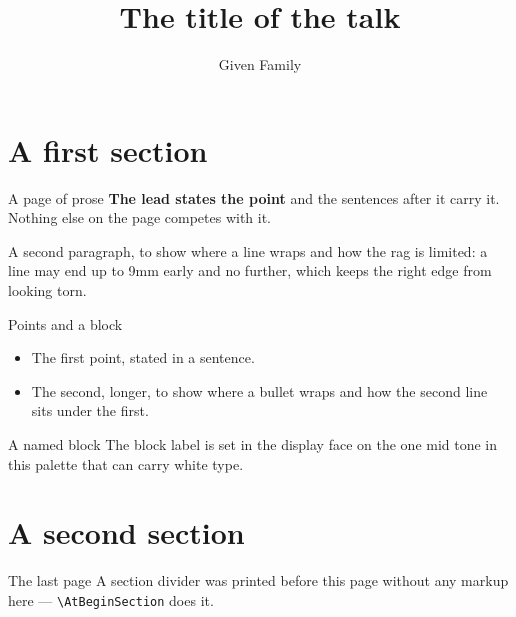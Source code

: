 \documentclass[aspectratio=169]{beamer}
\title[Short title]{The title of the talk}
\author[Given Family]{Given Family}
\begin{document}
\begin{frame}[plain]
  \morandititlepage
\end{frame}

\morandicontents

\section{A first section}

\begin{frame}{A page of prose}
  \textbf{The lead states the point} and the sentences after it carry it.
  Nothing else on the page competes with it.

  \medskip
  A second paragraph, to show where a line wraps and how the rag is limited:
  a line may end up to 9mm early and no further, which keeps the right edge
  from looking torn.
\end{frame}

\begin{frame}{Points and a block}
  \begin{itemize}
    \item The first point, stated in a sentence.
    \item The second, longer, to show where a bullet wraps and how the second
          line sits under the first.
  \end{itemize}

  \medskip
  \begin{block}{A named block}
    The block label is set in the display face on the one mid tone in this
    palette that can carry white type.
  \end{block}
\end{frame}

\section{A second section}

\begin{frame}[fragile]{The last page}
  A section divider was printed before this page without any markup here —
  \verb|\AtBeginSection| does it.
\end{frame}
\end{document}
